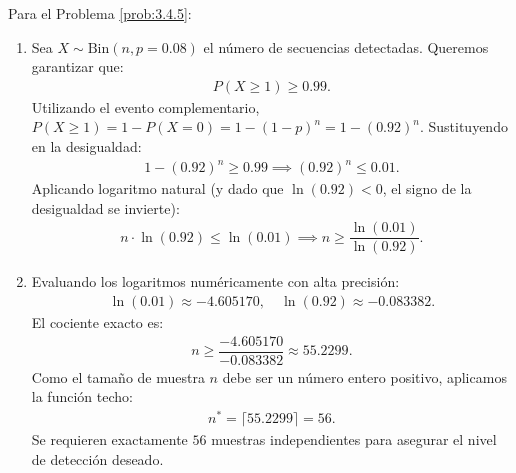 \begin{solucion}
	\label{sol:3.4.5}
	Para el Problema \ref{prob:3.4.5}:
	\begin{enumerate}
		\item Sea $X \sim \text{Bin}(n, p=0.08)$ el número de secuencias detectadas. Queremos garantizar que:
		\begin{align*}
			P(X \ge 1) \ge 0.99.
		\end{align*}
		Utilizando el evento complementario, $P(X \ge 1) = 1 - P(X = 0) = 1 - (1-p)^n = 1 - (0.92)^n$. Sustituyendo en la desigualdad:
		\begin{align*}
			1 - (0.92)^n \ge 0.99 \implies (0.92)^n \le 0.01.
		\end{align*}
		Aplicando logaritmo natural (y dado que $\ln(0.92) < 0$, el signo de la desigualdad se invierte):
		\begin{align*}
			n \cdot \ln(0.92) \le \ln(0.01) \implies n \ge \dfrac{\ln(0.01)}{\ln(0.92)}.
		\end{align*}
		\item Evaluando los logaritmos numéricamente con alta precisión:
		\begin{align*}
			\ln(0.01) \approx -4.605170, \quad \ln(0.92) \approx -0.083382.
		\end{align*}
		El cociente exacto es:
		\begin{align*}
			n \ge \dfrac{-4.605170}{-0.083382} \approx 55.2299.
		\end{align*}
		Como el tamaño de muestra $n$ debe ser un número entero positivo, aplicamos la función techo:
		\begin{align*}
			n^* = \lceil 55.2299 \rceil = 56.
		\end{align*}
		Se requieren exactamente $56$ muestras independientes para asegurar el nivel de detección deseado.
	\end{enumerate}
\end{solucion}

